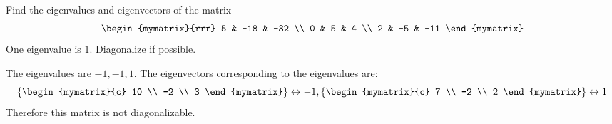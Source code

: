 \begin{enumialphparenastyle}

\begin{ex} Find the eigenvalues and eigenvectors of the matrix 
\begin{equation*}
\begin{mymatrix}{rrr}
5 & -18 & -32 \\
0 & 5 & 4 \\
2 & -5 & -11
\end{mymatrix}
\end{equation*}
One eigenvalue is $1.$ Diagonalize if possible.
\begin{sol}
The eigenvalues are $-1, -1, 1$. The eigenvectors corresponding to the eigenvalues are:
\[
\set{\begin{mymatrix}{c}
10 \\
-2 \\
3
\end{mymatrix} } \leftrightarrow -1,  \set{\begin{mymatrix}{c}
7 \\
-2 \\
2
\end{mymatrix} } \leftrightarrow 1
\]
Therefore this matrix is not diagonalizable. 
\end{sol}
\end{ex}


\end{enumialphparenastyle}
